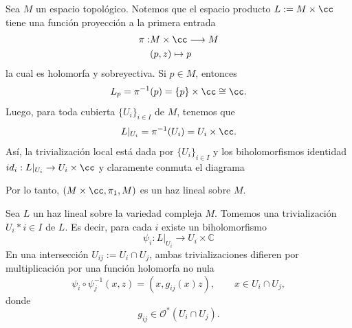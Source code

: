     \begin{example}\label{haztrivial}
    	Sea $M$ un espacio topológico. Notemos que el espacio producto $L:=M\times\cc$ tiene una función proyección a la primera entrada
    	\begin{align*}
    		\pi:&M\times\cc\longrightarrow M\\
    		&(p,z)\mapsto p
    	\end{align*}
    	la cual es holomorfa y sobreyectiva. Si $p\in M$, entonces
    	\begin{align*}
    		L_p=\pi^{-1}(p)=\{p\}\times\cc\cong \cc.
    	\end{align*}
    	Luego, para toda cubierta $\{U_i\}_{i\in I}$ de $M$, tenemos que 
    	\begin{align*}
    		L|_{U_i}=\pi^{-1}(U_i)=U_i\times \cc.
    	\end{align*} 
    	Así, la trivialización local está dada por $\{U_i\}_{i\in I}$ y los biholomorfismos identidad $id_i:L|_{U_i}\to U_i\times\cc$ y claramente conmuta el diagrama
    	\begin{center}
    	\end{center}
    	Por lo tanto, $(M\times\cc,\pi_1,M)$ es un haz lineal sobre $M$. 
    \end{example}
    
    Sea $L$ un haz lineal sobre la variedad compleja $M$. Tomemos una trivialización ${U_i}*{i\in I}$ de $L$. Es decir, para cada $i$ existe un biholomorfismo
    \begin{equation*}
    	\psi_i :L|_{U_i}\longrightarrow U_i\times \mathbb{C}
    \end{equation*}
    En una intersección $U_{ij}:=U_i\cap U_j$, ambas trivializaciones difieren por multiplicación por una función holomorfa no nula
    \begin{equation*}
    	\psi_i\circ \psi_j^{-1}(x,z)=(x,g_{ij}(x)z),
    	\qquad x\in U_i\cap U_j,
    \end{equation*}
    donde
    \begin{equation*}
    	g_{ij}\in \mathcal{O}^*(U_i\cap U_j).
    \end{equation*}
    
